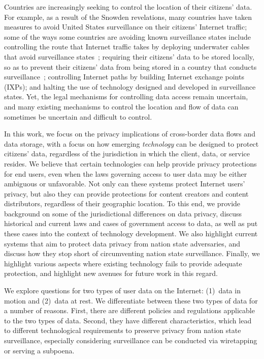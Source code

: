 Countries are increasingly seeking to control the location of their citizens'
data. For example, as a result of the Snowden revelations, many countries have
taken measures to avoid United States surveillance on their citizens' Internet
traffic; some of the ways some countries are avoiding known surveillance
states include controlling the route  that Internet traffic takes by deploying
underwater cables that avoid surveillance states~\cite{brazil}; requiring
their citizens' data to be stored locally, so as to prevent their citizens'
data from  being stored in a country that conducts surveillance~\cite{russia};
controlling Internet paths by building Internet exchange points (IXPs); and
halting the use of technology designed and developed in surveillance states.
Yet, the legal mechanisms for controlling data access remain uncertain, and
many existing mechanisms to control the location and flow of data can
sometimes be uncertain and difficult to control.


In this work, we focus on the privacy implications of cross-border data flows
and data storage, with a focus on how emerging {\em technology} can be
designed to protect citizens' data, regardless of the  jurisdiction in which
the client, data, or service resides. We believe that certain technologies can
help provide privacy protections for end users, even when the laws governing
access to user data may be either ambiguous or unfavorable. Not only can these
systems protect Internet users' privacy, but also they can  provide
protections  for content creators and content distributors, regardless of
their geographic location. To this end, we provide background on some of the
jurisdictional differences on data privacy, discuss historical and current
laws and cases of  government access to data, as well as put these cases into
the context  of technology development. We also highlight current systems that
aim to protect data privacy from nation  state adversaries, and discuss how
they stop short of circumventing nation state surveillance.  Finally, we
highlight various aspects where existing technology fails to provide adequate
protection, and highlight new avenues for future work in this regard.

We explore questions for two types of user data on the Internet: (1)~data in
motion and (2)~data at rest.  We differentiate between these two types of data
for a number of reasons.   First, there are different policies and regulations
applicable to the two types of data.  Second,  they have different
characteristics, which lead to different technological requirements to
preserve  privacy from nation state surveillance, especially considering
surveillance can be conducted via wiretapping or serving a subpoena.

